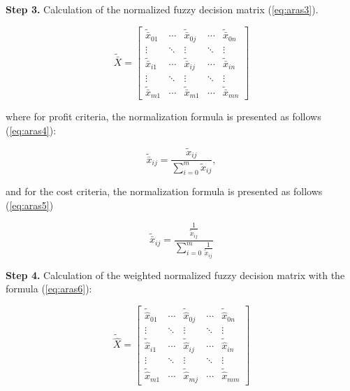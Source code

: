 \noindent \textbf{Step 3.} Calculation of the normalized fuzzy decision matrix (\ref{eq:aras3}).

\begin{equation}
\tilde{\bar{X}}=\left[\begin{array}{ccccc}
\tilde{\bar{x}}_{01} & \cdots & \tilde{\bar{x}}_{0 j} & \cdots & \tilde{\bar{x}}_{0 n} \\
\vdots & \ddots & \vdots & \ddots & \vdots \\
\tilde{\bar{x}}_{i 1} & \cdots & \tilde{\bar{x}}_{i j} & \cdots & \tilde{\bar{x}}_{i n} \\
\vdots & \ddots & \vdots & \ddots & \vdots \\
\tilde{\bar{x}}_{m 1} & \cdots & \tilde{\bar{x}}_{m 1} & \cdots & \tilde{\bar{x}}_{m n}
\end{array}\right]
\label{eq:aras3}
\end{equation}

\noindent where for profit criteria, the normalization formula is presented as follows (\ref{eq:aras4}):

\begin{equation}
\tilde{\bar{x}}_{i j}=\frac{\tilde{x}_{i j}}{\sum_{i=0}^m \tilde{x}_{i j}},
\label{eq:aras4}
\end{equation}

\noindent and for the cost criteria, the normalization formula is presented as follows (\ref{eq:aras5})

\begin{equation}
\tilde{\bar{x}}_{i j}=\frac{\frac{1}{\tilde{x}_{i j}}}{\sum_{i=0}^m \frac{1}{\tilde{x}_{i j}}}
\label{eq:aras5}
\end{equation}

\noindent \textbf{Step 4.} Calculation of the weighted normalized fuzzy decision matrix with the formula (\ref{eq:aras6}):

\begin{equation}
\widetilde{\widehat{X}}=\left[\begin{array}{ccccc}
\widetilde{\widehat{x}}_{01} & \cdots & \widetilde{\widehat{x}}_{0 j} & \cdots & \widetilde{\widehat{x}}_{0 n} \\
\vdots & \ddots & \vdots & \ddots & \vdots \\
\widetilde{\widehat{x}}_{i 1} & \cdots & \widetilde{\widehat{x}}_{i j} & \cdots & \widetilde{\widehat{x}}_{i n} \\
\vdots & \ddots & \vdots & \ddots & \vdots \\
\widetilde{\widehat{x}}_{m 1} & \cdots & \widetilde{\widehat{x}}_{m j} & \cdots & \widetilde{\widehat{x}}_{m m}
\end{array}\right]
\label{eq:aras6}
\end{equation}

